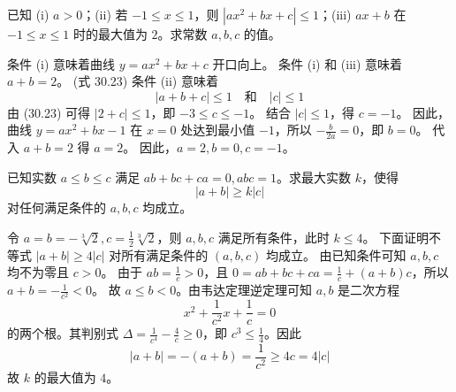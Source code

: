 \begin{questions}
\question 已知 (i) $a > 0$；(ii) 若 $-1 \le x \le 1$，则 $|ax^2+bx+c| \le 1$；(iii) $ax+b$ 在 $-1 \le x \le 1$ 时的最大值为 $2$。求常数 $a, b, c$ 的值。

\begin{solution}
条件 (i) 意味着曲线 $y=ax^2+bx+c$ 开口向上。
条件 (i) 和 (iii) 意味着 $a+b=2$。 (式 30.23)
条件 (ii) 意味着
\[
|a+b+c| \le 1 \quad \text{和} \quad |c| \le 1
\]
由 (30.23) 可得 $|2+c| \le 1$，即 $-3 \le c \le -1$。
结合 $|c| \le 1$，得 $c=-1$。
因此，曲线 $y=ax^2+bx-1$ 在 $x=0$ 处达到最小值 $-1$，所以 $-\frac{b}{2a}=0$，即 $b=0$。
代入 $a+b=2$ 得 $a=2$。
因此，$a=2, b=0, c=-1$。
\end{solution}

\question 已知实数 $a \le b \le c$ 满足 $ab+bc+ca=0, abc=1$。求最大实数 $k$，使得
\[
|a+b| \ge k|c|
\]
对任何满足条件的 $a, b, c$ 均成立。

\begin{solution}
令 $a=b=-\sqrt[3]{2}, c=\frac{1}{2}\sqrt[3]{2}$，则 $a, b, c$ 满足所有条件，此时 $k \le 4$。
下面证明不等式 $|a+b| \ge 4|c|$ 对所有满足条件的 $(a, b, c)$ 均成立。
由已知条件可知 $a, b, c$ 均不为零且 $c > 0$。
由于 $ab = \frac{1}{c} > 0$，且 $0 = ab+bc+ca = \frac{1}{c} + (a+b)c$，所以 $a+b = -\frac{1}{c^2} < 0$。
故 $a \le b < 0$。由韦达定理逆定理可知 $a, b$ 是二次方程
\[
x^2 + \frac{1}{c^2}x + \frac{1}{c} = 0
\]
的两个根。其判别式 $\Delta = \frac{1}{c^4} - \frac{4}{c} \ge 0$，即 $c^3 \le \frac{1}{4}$。因此
\[
|a+b| = -(a+b) = \frac{1}{c^2} \ge 4c = 4|c|
\]
故 $k$ 的最大值为 $4$。
\end{solution}
        

\end{questions}
